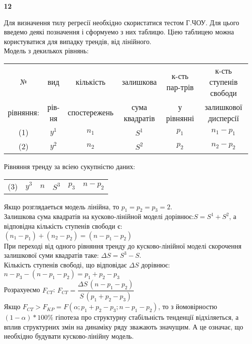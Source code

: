 \documentclass[a4paper,12pt]{article}
\newcommand\tab[1][1cm]{\hspace*{#1}}
\begin{document}
\begin{LARGE}
\textbf{12}\\
\end{LARGE}


Для визначення тилу регресії необхідно скористатися тестом Г.ЧОУ. Для цього введемо деякі позначення і сформуемо з них таблицю. Ціею таблицею можна користуватися для випадку трендів, від лінійного.\\
Модель з декилькох рівнянь:
\begin{center}
\begin{tabular}{cccccc}
№ & вид & кількість & залишкова & к-сть пар-трів & к-сть ступенів свободи \\
рівняння: & рів-ня & спостережень & сума квадратів & у рівнянні & залишкової дисперсії \\
(1) & $y^1$ & $n_1$ & $S^1$ & $p_1$ & $n_1-p_1$\\
(2) & $y^2$ & $n_2$ & $S^2$ & $p_2$ & $n_2-p_2$\\
\end{tabular}
\end{center}
Рівняння тренду за всіею сукупністю даних:
\begin{center}
\begin{tabular}{cccccc}
(3) \tab & $y^3$ \tab \tab & $n$ \tab \tab & $S^3$ \tab \tab & $p_3$\tab  \tab & $n-p_2$ \tab \\
\end{tabular}
\end{center}
Якщо розглядаеться модель лінійна, то $p_1=p_2=p_3=2$.\\
Залишкова сума квадратів на кусково-лінійной моделі дорівнює:$S=S^1+S^2$, а відповідна кількість ступенів свободи є:\\
$(n_1-p_1)+(n_2-p_2)=(n-p_1-p_2)$\\
При переході від одного рівняння тренду до кусково-лінійної моделі скорочення залишкової суми квадратів  таке: $\Delta S=S^3-S$.\\
Кількість ступенів свободі, що відповідає $\Delta S$ дорівнює:
$n-p_3-(n-p_1-p_2)=p_1+p_2-p_3$\\
Розрахуеємо $F_{CT}$:
$F_{CT}=\dfrac{\Delta S \, (n-p_1-p_2)}{S \, (p_1+p_2-p_3)}$\\
Якщо $F_{CT}>F_{KP}=F(\alpha;p_1+p_2-p_3;n-p_1-p_2)$, то з йомовірностю $(1-\alpha)*100\%$ гіпотеза про структурну стабільність тенденції відхіляеться, а вплив структурних змін на динаміку ряду зважають значущим. А це означає, що необхідно будувати кусково-лінійну модель.\\
\end{document}
